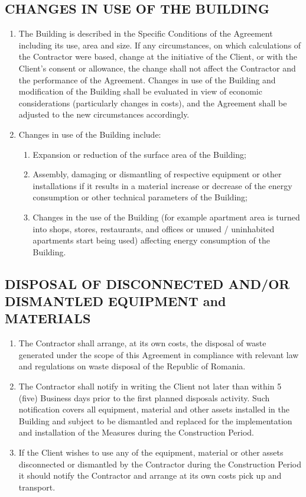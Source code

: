 \begin{multicols}{2}
\subsection{CHANGES IN USE OF THE BUILDING}
\begin{enumerate}
	\item	The Building is described in the Specific Conditions of the Agreement including its use, area and size. If any circumstances, on which calculations of the Contractor were based, change at the initiative of the Client, or with the Client’s consent or allowance, the change shall not affect the Contractor and the performance of the Agreement. Changes in use of the Building and modification of the Building shall be evaluated in view of economic considerations (particularly changes in costs), and the Agreement shall be adjusted to the new circumstances accordingly.
	\item	Changes in use of the Building include:
	\begin{enumerate}
		\item	Expansion or reduction of the surface area of the Building;
		\item	Assembly, damaging or dismantling of respective equipment or other installations if it results in a material increase or decrease of the energy consumption or other technical parameters of the Building;
		\item	Changes in the use of the Building (for example apartment area is turned into shops, stores, restaurants, and offices or unused / uninhabited apartments start being used) affecting energy consumption of the Building.
	\end{enumerate}
\end{enumerate}


\subsection{DISPOSAL OF DISCONNECTED AND/OR DISMANTLED EQUIPMENT and MATERIALS}
\begin{enumerate}
	\item	The Contractor shall arrange, at its own costs, the disposal of waste generated under the scope of this Agreement in compliance with relevant law and regulations on waste disposal of the Republic of Romania.
	\item	The Contractor shall notify in writing the Client not later than within 5 (five) Business days prior to the first planned disposals activity. Such notification covers all equipment, material and other assets installed in the Building and subject to be dismantled and replaced for the implementation and installation of the Measures during the Construction Period.
	\item	If the Client wishes to use any of the equipment, material or other assets disconnected or dismantled by the Contractor during the Construction Period it should notify the Contractor and arrange at its own costs pick up and transport.
\end{enumerate}


\end{multicols}
